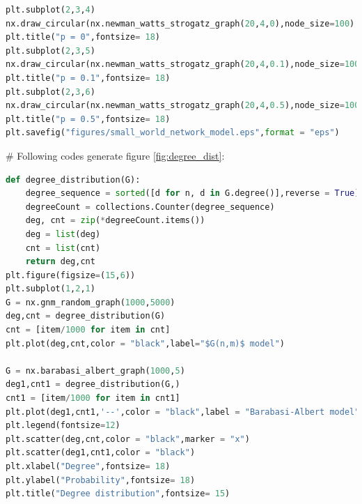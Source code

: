 \documentclass[12pt]{article}
\begin{document}
{\begin{lstlisting}[breaklines=true,language=Python]
plt.subplot(2,3,4)
nx.draw_circular(nx.newman_watts_strogatz_graph(20,4,0),node_size=100)
plt.title("p = 0",fontsize= 18)
plt.subplot(2,3,5)
nx.draw_circular(nx.newman_watts_strogatz_graph(20,4,0.1),node_size=100)
plt.title("p = 0.1",fontsize= 18)
plt.subplot(2,3,6)
nx.draw_circular(nx.newman_watts_strogatz_graph(20,4,0.5),node_size=100)
plt.title("p = 0.5",fontsize= 18)
plt.savefig("figures/small_world_network_model.eps",format = "eps")
\end{lstlisting}
\noindent
\newline
\# Following codes generate figure \ref{fig:degree_dist}:
\begin{lstlisting}[breaklines=true,language=Python]
    def degree_distribution(G):
    degree_sequence = sorted([d for n, d in G.degree()],reverse = True)
    degreeCount = collections.Counter(degree_sequence)
    deg, cnt = zip(*degreeCount.items())
    deg = list(deg)
    cnt = list(cnt)
    return deg,cnt
plt.figure(figsize=(15,6))
plt.subplot(1,2,1)
G = nx.gnm_random_graph(1000,5000)
deg,cnt = degree_distribution(G)
cnt = [item/1000 for item in cnt]
plt.plot(deg,cnt,color = "black",label="$G(n,m)$ model")

G = nx.barabasi_albert_graph(1000,5)
deg1,cnt1 = degree_distribution(G,)
cnt1 = [item/1000 for item in cnt1]
plt.plot(deg1,cnt1,'--',color = "black",label = "Barabasi-Albert model")
plt.legend(fontsize=12)
plt.scatter(deg,cnt,color = "black",marker = "x")
plt.scatter(deg1,cnt1,color = "black")
plt.xlabel("Degree",fontsize= 18)
plt.ylabel("Probability",fontsize= 18)
plt.title("Degree distribution",fontsize= 15)


\end{lstlisting}}
\end{document}
